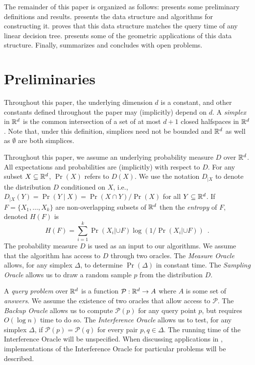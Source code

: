 \documentclass{patmorin}
\begin{document}
The remainder of this paper is organized as follows: 
presents some preliminary definitions and results. 
presents the data structure and algorithms for constructing it.
 proves that this data structure matches the query
time of any linear decision tree.   presents
some of the geometric applications of this data structure. Finally,
 summarizes and concludes with open problems.

\section{Preliminaries}

Throughout this paper, the underlying dimension $d$ is a constant, and
other constants defined throughout the paper may (implicitly) depend
on $d$.  A \emph{simplex} in $\mathbb{R}^d$ is the common intersection of a
set of at most $d+1$ closed halfspaces in $\mathbb{R}^d$. Note that, under this
definition, simplices need not be bounded and $\mathbb{R}^d$ as well as $\emptyset$ are both simplices.

Throughout this paper, we assume an underlying probability measure
$D$ over $\mathbb{R}^d$.  All expectations and probabilities are (implicitly)
with respect to $D$.  For any subset $X\subseteq\mathbb{R}^d$, $\Pr(X)$ refers
to $D(X)$.  We use the notation $D_{|X}$ to denote the distribution $D$
conditioned on $X$, i.e., $D_{|X}(Y)=\Pr(Y\mid X)=\Pr(X\cap Y)/\Pr(X)$
for all $Y\subseteq\mathbb{R}^d$.  If $F=\{X_1,\ldots,X_k\}$ are non-overlapping
subsets of $\mathbb{R}^d$ then the \emph{entropy} of $F$, denoted $H(F)$ is
\[
    H(F) = \sum_{i=1}^k \Pr(X_i|\cup F)\log(1/\Pr(X_i|\cup F)) \enspace .
\]
The probability measure $D$ is used as an input to our algorithms.
We assume that the algorithm has access to $D$ through two oracles.
The \emph{Measure Oracle} allows, for any simplex $\Delta$, to determine
$\Pr(\Delta)$ in constant time.  The \emph{Sampling Oracle} allows us
to draw a random sample $p$ from the distribution $D$.

A \emph{query problem} over $\mathbb{R}^d$ is a function
$\mathcal{P}:\mathbb{R}^d\rightarrow A$ where $A$ is some set of \emph{answers}.
We assume the existence of two oracles that allow access to $\mathcal{P}$.
The \emph{Backup Oracle} allows us to compute $\mathcal{P}(p)$ for
any query point $p$, but requires $O(\log n)$ time to do so.  The
\emph{Interference Oracle} allows us to test, for any simplex $\Delta$,
if $\mathcal{P}(p)=\mathcal{P}(q)$ for every pair $p,q\in\Delta$.
The running time of the Interference Oracle will be unspecified.
When discussing applications in , implementations
of the Interference Oracle for particular problems will be described.
\end{document}
